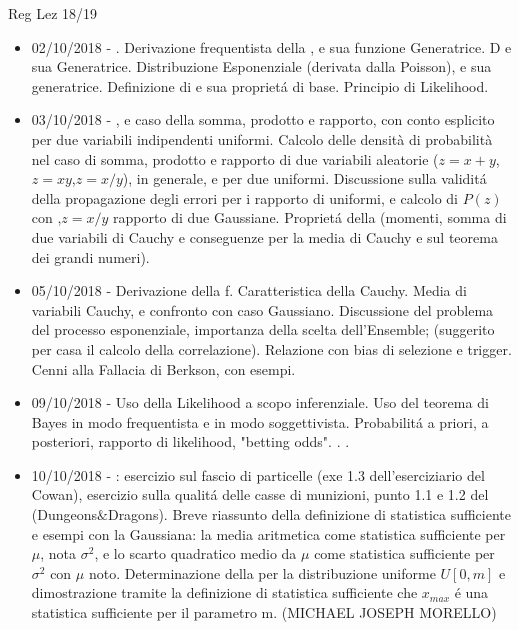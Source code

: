 \begin{frame}[allowframebreaks]{Reg Lez 18/19}
\begin{itemize}
    \item 02/10/2018 - . Derivazione frequentista della , e sua funzione Generatrice. D e sua Generatrice. Distribuzione Esponenziale (derivata dalla Poisson), e sua generatrice. Definizione di  e sua propriet\'a di base. Principio di Likelihood.
    
    \item 03/10/2018 - , e caso della somma, prodotto e rapporto, con conto esplicito per due variabili indipendenti uniformi. Calcolo delle densità di probabilità nel caso di somma, prodotto e rapporto di due variabili aleatorie ($z=x+y$,$z=xy$,$z=x/y$), in generale, e per due uniformi. Discussione sulla validit\'a della propagazione degli errori per i rapporto di uniformi, e calcolo di $P(z)$ con ,$z=x/y$ rapporto di due Gaussiane. Propriet\'a della  (momenti, somma di due variabili di Cauchy e conseguenze per la media di Cauchy e sul teorema dei grandi numeri).
    
    \item 05/10/2018 - Derivazione della f. Caratteristica della Cauchy. Media di variabili Cauchy, e confronto con caso Gaussiano. Discussione del problema del processo esponenziale, importanza della scelta dell'Ensemble;  (suggerito per casa il calcolo della correlazione). Relazione con bias di selezione e trigger. Cenni alla Fallacia di Berkson, con esempi.
    
    \item 09/10/2018 - Uso della Likelihood a scopo inferenziale. Uso del teorema di Bayes in modo frequentista e in modo soggettivista. Probabilit\'a a priori, a posteriori, rapporto di likelihood, "betting odds". . .
    
    \item 10/10/2018 - : esercizio sul fascio di particelle (exe 1.3 dell’eserciziario del Cowan), esercizio sulla qualit\'a delle casse di munizioni, punto 1.1 e 1.2 del  (Dungeons$\&$Dragons). Breve riassunto della definizione di statistica sufficiente e esempi con la Gaussiana: la media aritmetica come statistica sufficiente per $\mu$, nota $\sigma^2$, e lo scarto quadratico medio da $\mu$ come statistica sufficiente per $\sigma^2$ con $\mu$ noto. Determinazione della  per la distribuzione uniforme $U[0,m]$ e dimostrazione tramite la definizione di statistica sufficiente che $x_{max}$ \'e una statistica sufficiente per il parametro m. (MICHAEL JOSEPH MORELLO)
    

\end{itemize}
\end{frame}
